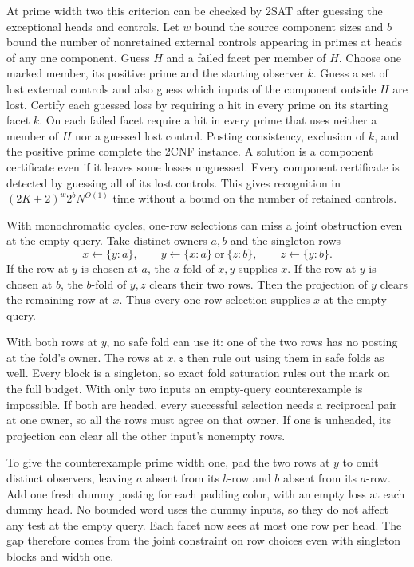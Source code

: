 At prime width two this criterion can be checked by
2SAT after guessing the exceptional heads and controls.
Let $w$ bound the source component sizes and $b$ bound
the number of nonretained external controls appearing
in primes at heads of any one component. Guess $H$ and
a failed facet per member of $H$. Choose one marked
member, its positive prime and the starting observer
$k$. Guess a set of lost external controls and also
guess which inputs of the component outside $H$ are
lost. Certify each guessed loss by requiring a hit in
every prime on its starting facet $k$. On each failed
facet require a hit in every prime that uses neither
a member of $H$ nor a guessed lost control. Posting
consistency, exclusion of $k$, and the positive prime
complete the 2CNF instance. A solution is a component
certificate even if it leaves some losses unguessed.
Every component certificate is detected by guessing
all of its lost controls. This gives recognition in
$(2K+2)^w2^bN^{O(1)}$ time without a bound on the
number of retained controls.

With monochromatic cycles, one-row selections can
miss a joint obstruction even at the empty query.
Take distinct owners $a,b$ and the singleton rows
\[
        x\gets\{y:a\},\qquad
        y\gets\{x:a\}\ \text{or}\ \{z:b\},\qquad
        z\gets\{y:b\}.
\]
If the row at $y$ is chosen at $a$, the $a$-fold of
$x,y$ supplies $x$. If the row at $y$ is chosen at $b$,
the $b$-fold of $y,z$ clears their two rows. Then the
projection of $y$ clears the remaining row at $x$.
Thus every one-row selection supplies $x$ at the
empty query.

With both rows at $y$, no safe fold can use it:
one of the two rows has no posting at the fold's
owner. The rows at $x,z$ then rule out using them
in safe folds as well. Every block is a singleton,
so exact fold saturation rules out the mark on the
full budget. With only two inputs an empty-query
counterexample is impossible. If both are headed,
every successful selection needs a reciprocal pair
at one owner, so all the rows must agree on that
owner. If one is unheaded, its projection can
clear all the other input's nonempty rows.

To give the counterexample prime width one, pad
the two rows at $y$ to omit distinct observers,
leaving $a$ absent from its $b$-row and $b$ absent
from its $a$-row. Add one fresh dummy posting for
each padding color, with an empty loss at each
dummy head. No bounded word uses the dummy
inputs, so they do not affect any test at the
empty query. Each facet now sees at most one
row per head. The gap therefore comes from the
joint constraint on row choices even with
singleton blocks and width one.

